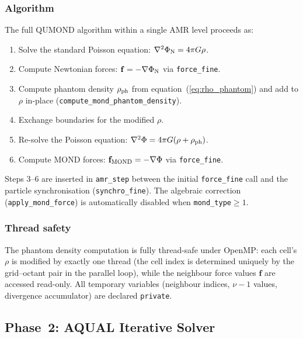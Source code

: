 \documentclass[fleqn,usenatbib]{mnras}
\newcommand{\code}[1]{\texttt{#1}}
\newcommand{\rhoph}{\rho_{\rm ph}}
\begin{document}
\subsubsection{Algorithm}

The full QUMOND algorithm within a single AMR level proceeds as:
\begin{enumerate}
\item Solve the standard Poisson equation:
  $\nabla^2\Phi_{\rm N} = 4\pi G\rho$.
\item Compute Newtonian forces:
  $\mathbf{f} = -\nabla\Phi_{\rm N}$ via \code{force\_fine}.
\item Compute phantom density $\rhoph$ from equation~(\ref{eq:rho_phantom})
  and add to $\rho$ in-place (\code{compute\_mond\_phantom\_density}).
\item Exchange boundaries for the modified $\rho$.
\item Re-solve the Poisson equation:
  $\nabla^2\Phi = 4\pi G(\rho + \rhoph)$.
\item Compute MOND forces:
  $\mathbf{f}_{\rm MOND} = -\nabla\Phi$ via \code{force\_fine}.
\end{enumerate}
Steps 3--6 are inserted in \code{amr\_step} between the initial
\code{force\_fine} call and the particle synchronisation
(\code{synchro\_fine}).  The algebraic correction
(\code{apply\_mond\_force}) is automatically disabled when
\code{mond\_type}$\geq 1$.

\subsubsection{Thread safety}

The phantom density computation is fully thread-safe under OpenMP:
each cell's $\rho$ is modified by exactly one thread (the cell index
is determined uniquely by the grid--octant pair in the parallel loop),
while the neighbour force values $\mathbf{f}$ are accessed read-only.
All temporary variables (neighbour indices, $\nu-1$ values, divergence
accumulator) are declared \code{private}.

\subsection{Phase~2: AQUAL Iterative Solver}
\label{sec:mond_phase2}
\end{document}
